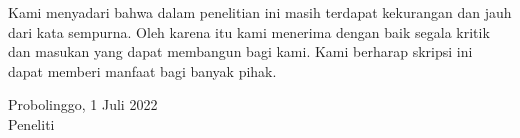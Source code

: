 Kami menyadari bahwa dalam penelitian ini masih terdapat kekurangan dan jauh dari kata sempurna. Oleh karena itu kami menerima dengan baik segala kritik dan masukan yang dapat membangun bagi kami. Kami berharap skripsi ini dapat memberi manfaat bagi banyak pihak.

\begin{flushright}
Probolinggo, 1 Juli 2022\\
Peneliti
\end{flushright}